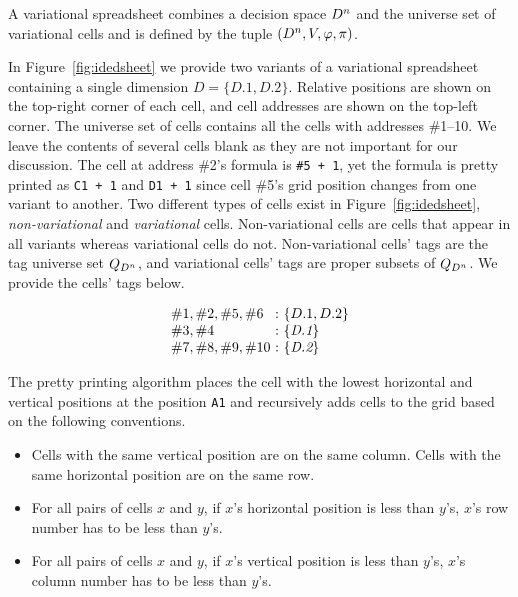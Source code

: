 \documentclass[conference]{IEEEtran}
\def\OB#1{\ifmmode#1\else\mbox{$#1$}\fi}
\newcommand{\set}[1]{\ensuremath{\{#1\}}}
\newcommand{\prog}[1]{{\small\texttt{#1}}}
\newcommand{\dimset}[1][D]{\OB{#1^n}}
\newcommand{\decstr}{\OB{{\cal D}}}
\newcommand{\qt}[1][\decstr]{\OB{Q_{#1}}}
\newcommand{\mapname}[1]{\textit{#1}}
\newcommand{\dset}[1]{\{#1\}}
\newcommand{\gcell}[1]{\##1}
\newcommand{\posSym}{\OB{\pi}}
\newcommand{\varSym}{\OB{V}}
\newcommand{\fmlSym}{\OB{\varphi}}
\begin{document}
A variational spreadsheet combines a decision space $\dimset$ and the universe set of variational cells and is defined by the tuple $(\dimset, \varSym, \fmlSym, \posSym)$.

In Figure~\ref{fig:idedsheet} we provide two variants of a variational spreadsheet containing a single dimension $\mapname{D} = \set{D.1, D.2}$.
Relative positions are shown on the top-right corner of each cell, and cell addresses are shown on the top-left corner.
The universe set of cells contains all the cells with addresses \gcell{1--10}.
We leave the contents of several cells blank as they are not important for our discussion.
The cell at address \gcell{2}'s formula is \prog{\#5 + 1}, yet the formula is pretty printed as \prog{C1 + 1} and
\prog{D1 + 1} since cell \gcell{5}'s grid position changes from one variant to another. 
Two different types of cells exist in Figure~\ref{fig:idedsheet}, \emph{non-variational} and \emph{variational} cells.
Non-variational cells are cells that appear in all variants whereas variational cells do not. 
Non-variational cells' tags are the tag universe set $\qt[D^n]$, and variational cells' tags are proper subsets of $\qt[D^n]$.
We provide the cells' tags below.

\[
\begin{array}{l@{\ : \ }l}
    \gcell{1}, \gcell{2}, \gcell{5}, \gcell{6} & \set{D.1, D.2} \\
    \gcell{3}, \gcell{4} & \dset{\mapname{D.1}} \\
    \gcell{7}, \gcell{8}, \gcell{9}, \gcell{10} & \dset{\mapname{D.2}} \\
\end{array}
\]

The pretty printing algorithm places the cell with the lowest horizontal and vertical positions at the position \prog{A1} and recursively adds cells to the grid based on the following conventions.

\begin{itemize}
    \item Cells with the same vertical position are on the same column. Cells with the same horizontal position are on the same row.
    \item For all pairs of cells $x$ and $y$, if $x$'s horizontal position is less than $y$'s, $x$'s row number has to be less than $y$'s.
    \item For all pairs of cells $x$ and $y$, if $x$'s vertical position is less than $y$'s, $x$'s column number has to be less than $y$'s.
\end{itemize}
\end{document}

